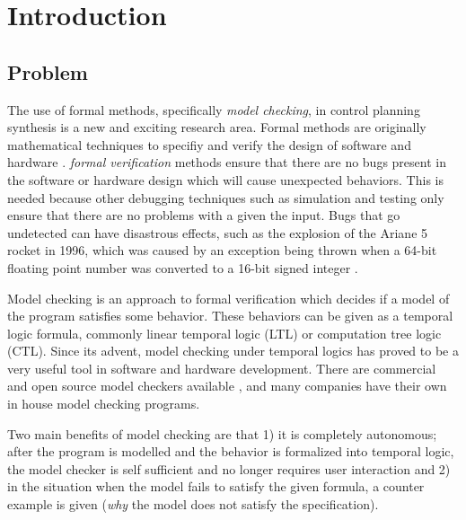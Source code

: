 \chapter{Introduction}
\section{Problem}
The use of formal methods, specifically \textit{model checking}, in control planning synthesis is a new and exciting research area. Formal methods are originally mathematical techniques to specifiy and verify the design of software and hardware \cite{clarke96}. \textit{formal verification} methods ensure that there are no bugs present in the software or hardware design which will cause unexpected behaviors. This is needed because other debugging techniques such as simulation and testing only ensure that there are no problems with a given the input. Bugs that go undetected can have disastrous effects, such as the explosion of the Ariane 5 rocket in 1996, which was caused by an exception being thrown when a 64-bit floating point number was converted to a 16-bit signed integer \cite{clarke99}. 

Model checking is an approach to formal verification which decides if a model of the program satisfies some behavior. These behaviors can be given as a temporal logic formula, commonly linear temporal logic (LTL) or computation tree logic (CTL). Since its advent, model checking under temporal logics has proved to be a very useful tool in software and hardware development. There are commercial and open source model checkers available \cite{holzmann03}, \cite{cimatti02} and many companies have their own in house model checking programs. 

Two main benefits of model checking are that 1) it is completely autonomous; after the program is modelled and the behavior is formalized into temporal logic, the model checker is self sufficient and no longer requires user interaction and 2) in the situation when the model fails to satisfy the given formula, a counter example is given (\textit{why} the model does not satisfy the specification). 

